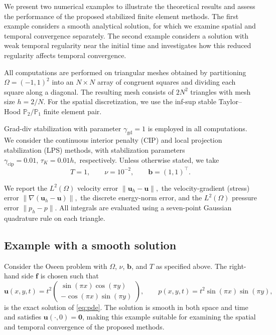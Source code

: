 \documentclass[11pt,a4paper]{article}
\numberwithin{equation}{section}
\theoremstyle{plain}
\theoremstyle{definition}
\theoremstyle{remark}
\begin{document}
We present two numerical examples to illustrate the theoretical results and assess the 
performance of the proposed stabilized finite element methods. The first example 
considers a smooth analytical solution, for which we examine spatial and temporal 
convergence separately. The second example considers a solution with weak temporal 
regularity near the initial time and investigates how this reduced regularity affects 
temporal convergence.

All computations are performed on triangular meshes obtained by partitioning
$\Omega=(-1,1)^2$ into an $N\times N$ array of congruent squares and dividing
each square along a diagonal. The resulting mesh consists of $2N^2$ triangles
with mesh size $h=2/N$. For the spatial discretization, we use the inf-sup
stable Taylor--Hood $\mathbb{P}_2/\mathbb{P}_1$ finite element pair.

Grad-div stabilization with parameter $\gamma_{\mathrm{gd}}=1$ is employed in
all computations. We consider the continuous interior penalty (CIP) and local
projection stabilization (LPS) methods, with stabilization parameters
$
\gamma_{\mathrm{cip}}=0.01,
\,
\tau_K=0.01h,
$
respectively. Unless otherwise stated, we take
\[
T=1,\qquad
\nu=10^{-2},\qquad
\boldsymbol b=(1,1)^\top.
\]

We report the $L^2(\Omega)$ velocity error
$
\|\boldsymbol u_h-\boldsymbol u\|,
$
the velocity-gradient (stress) error
$
\|\nabla(\boldsymbol u_h-\boldsymbol u)\|,
$
the discrete energy-norm error, and the $L^2(\Omega)$ pressure error
$
\|p_h-p\|.
$
All integrals are evaluated using a seven-point Gaussian quadrature rule on
each triangle.



\subsection{Example with a smooth solution}
\label{sec:example1}

Consider the Oseen problem with $\Omega$, $\nu$, $\boldsymbol{b}$, and $T$ as specified above. The right-hand side $\boldsymbol{f}$ is chosen such that
\begin{equation}
\boldsymbol{u}(x,y,t)=t^{2}
\begin{pmatrix}
\sin(\pi x)\cos(\pi y)\\[2pt]
-\cos(\pi x)\sin(\pi y)
\end{pmatrix},
\qquad
p(x,y,t)=t^{2}\sin(\pi x)\sin(\pi y),
\end{equation}
is the exact solution of \eqref{eq:pde}. The solution is smooth in both space and time and satisfies $\boldsymbol{u}(\cdot,0)=\boldsymbol{0}$, making this example suitable for examining the spatial and temporal convergence of the proposed methods.
\end{document}
